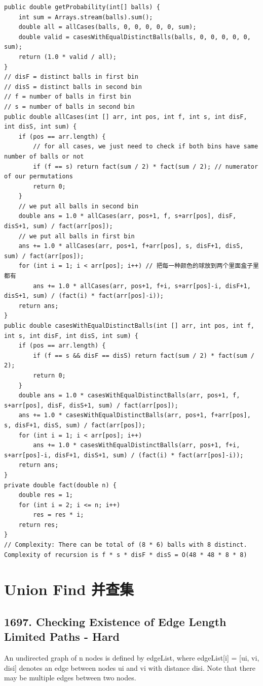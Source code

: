 \documentclass[9pt, b5paaper]{book}
\begin{document}
\begin{verbatim}
public double getProbability(int[] balls) {
    int sum = Arrays.stream(balls).sum();
    double all = allCases(balls, 0, 0, 0, 0, 0, sum);
    double valid = casesWithEqualDistinctBalls(balls, 0, 0, 0, 0, 0, sum);
    return (1.0 * valid / all);
}
// disF = distinct balls in first bin
// disS = distinct balls in second bin
// f = number of balls in first bin
// s = number of balls in second bin
public double allCases(int [] arr, int pos, int f, int s, int disF, int disS, int sum) {
    if (pos == arr.length) {
        // for all cases, we just need to check if both bins have same number of balls or not
        if (f == s) return fact(sum / 2) * fact(sum / 2); // numerator of our permutations
        return 0;
    }
    // we put all balls in second bin
    double ans = 1.0 * allCases(arr, pos+1, f, s+arr[pos], disF, disS+1, sum) / fact(arr[pos]);
    // we put all balls in first bin
    ans += 1.0 * allCases(arr, pos+1, f+arr[pos], s, disF+1, disS, sum) / fact(arr[pos]);
    for (int i = 1; i < arr[pos]; i++) // 把每一种颜色的球放到两个里面盒子里都有
        ans += 1.0 * allCases(arr, pos+1, f+i, s+arr[pos]-i, disF+1, disS+1, sum) / (fact(i) * fact(arr[pos]-i));
    return ans;
}
public double casesWithEqualDistinctBalls(int [] arr, int pos, int f, int s, int disF, int disS, int sum) {
    if (pos == arr.length) {
        if (f == s && disF == disS) return fact(sum / 2) * fact(sum / 2);
        return 0;
    }
    double ans = 1.0 * casesWithEqualDistinctBalls(arr, pos+1, f, s+arr[pos], disF, disS+1, sum) / fact(arr[pos]);
    ans += 1.0 * casesWithEqualDistinctBalls(arr, pos+1, f+arr[pos], s, disF+1, disS, sum) / fact(arr[pos]);
    for (int i = 1; i < arr[pos]; i++) 
        ans += 1.0 * casesWithEqualDistinctBalls(arr, pos+1, f+i, s+arr[pos]-i, disF+1, disS+1, sum) / (fact(i) * fact(arr[pos]-i));
    return ans;
}
private double fact(double n) {
    double res = 1;
    for (int i = 2; i <= n; i++) 
        res = res * i;
    return res;
}
// Complexity: There can be total of (8 * 6) balls with 8 distinct. Complexity of recursion is f * s * disF * disS = O(48 * 48 * 8 * 8)
\end{verbatim}


\chapter{Union Find 并查集}
\label{sec-17}
\section{1697. Checking Existence of Edge Length Limited Paths - Hard}
\label{sec-17-1}
An undirected graph of n nodes is defined by edgeList, where edgeList[i] = [ui, vi, disi] denotes an edge between nodes ui and vi with distance disi. Note that there may be multiple edges between two nodes.
\end{document}
